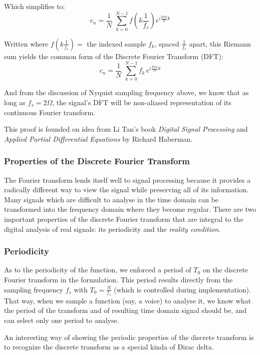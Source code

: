 \documentclass[12pt]{article}
\begin{document}
Which simplifies to: \[ c_{n} = \frac{1}{N} \; \sum_{k = 0}^{N-1} f(k
\frac{1}{f_s}) e^{i \frac{2\pi n}{N}k} \]

Written where \( f(k \frac{1}{f_s}) =\) the indexed sample \(f_k\), spaced
\(\frac{1}{f_s}\) apart, this Riemann sum yields the common form of the
Discrete Fourier Transform (DFT): \[ c_{n} = \frac{1}{N} \; \sum_{k = 0}^{N-1}
f_k \, e^{i \frac{2\pi n}{N}k} \]

And from the discussion of Nyquist sampling frequency above, we know that as
long as \(f_s = 2\Omega\), the signal's DFT will be non-aliased representation
of its continuous Fourier transform.

This proof is founded on idea from Li Tan's book \emph{Digital Signal
Processing} and \emph{Applied Partial Differential Equations} by Richard
Haberman.

\subsubsection{Properties of the Discrete Fourier Transform}

The Fourier transform lends itself well to signal processing because it
provides a radically different way to view the signal while preserving all of
its information. Many signals which are difficult to analyse in the time domain
can be transformed into the frequency domain where they become regular. There
are two important properties of the discrete Fourier transform that are
integral to the digital analysis of real signals: its periodicity and the
\emph{reality condition}.

\subsubsection*{Periodicity}
As to the periodicity of the function, we enforced a period of \(T_0\) on the
discrete Fourier transform in the formulation. This period results directly
from the sampling frequency \(f_s\) with \(T_0 = \frac{N}{f_s}\) (which is
controlled during implementation). That way, when we sample a function (say, a
voice) to analyse it, we know what the period of the transform and of resulting
time domain signal should be, and can select only one period to analyse.

An interesting way of showing the periodic properties of the discrete transform
is to recognize the discrete transform as a special kinda of Dirac delta. 
\end{document}
